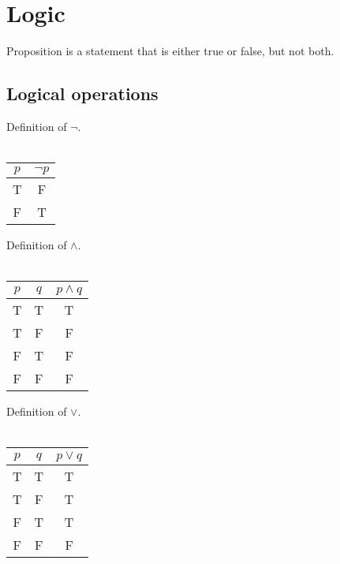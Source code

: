 \chapter{Logic}
\begin{defn}
Proposition is a statement that is either true or false, but not both.
\end{defn}

\section{Logical operations}

\begin{defn}
\label{Definition:lnot}
Definition of $\lnot$. \\ \\
\begin{tabular}{|c|c|}
\hline
$p$ & $\lnot p$  \\
\hline
T & F \\
\hline
F & T \\
\hline
\end{tabular}
\end{defn}

\begin{defn}
Definition of $\land$. \\ \\
\begin{tabular}{|c|c|c|}
\hline
$p$ & $q$ & $p \land q$ \\
\hline
T & T & T \\
\hline
T & F & F \\
\hline
F & T & F \\
\hline
F & F & F \\
\hline
\end{tabular}
\end{defn}

\begin{defn}
Definition of $\lor$. \\ \\
\begin{tabular}{|c|c|c|}
\hline
$p$ & $q$ & $p \lor q$ \\
\hline
T & T & T \\
\hline
T & F & T \\
\hline
F & T & T \\
\hline
F & F & F \\
\hline
\end{tabular}
\end{defn}

